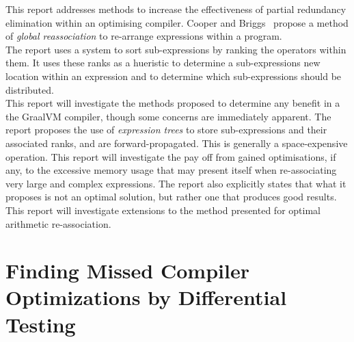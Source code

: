 \documentclass[12pt,openany,a4paper]{book}
\begin{document}
This report addresses methods to increase the effectiveness of partial redundancy
elimination within an optimising compiler. Cooper and Briggs~\cite{effective-pre} propose 
a method of
\emph{global reassociation} to re-arrange expressions within a program.\\
The report uses a system to sort sub-expressions by ranking the operators within
them. It uses these ranks as a hueristic to determine a sub-expressions new
location within an expression and to determine which sub-expressions should be
distributed.\\
This report will investigate the methods proposed to determine any benefit in
a the GraalVM compiler, though some concerns are immediately apparent. The report
proposes the use of \emph{expression trees} to store sub-expressions and their
associated ranks, and are forward-propagated. This is generally a space-expensive
operation. This report will investigate the pay off from gained optimisations, if any, to 
the excessive memory usage that may present itself when re-associating very large 
and complex expressions. The report also explicitly states that what it proposes 
is not an optimal solution, but rather one that produces good results. 
This report will investigate extensions to the method presented for optimal 
arithmetic re-association.

\section{Finding Missed Compiler Optimizations by Differential Testing}
\label{litrev2}
\end{document}
